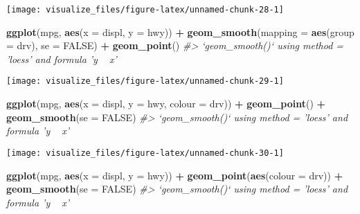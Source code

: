 \documentclass[]{book}
\newenvironment{Shaded}{\begin{snugshade}}{\end{snugshade}}
\newcommand{\CommentTok}[1]{\textcolor[rgb]{0.56,0.35,0.01}{\textit{#1}}}
\newcommand{\DataTypeTok}[1]{\textcolor[rgb]{0.13,0.29,0.53}{#1}}
\newcommand{\KeywordTok}[1]{\textcolor[rgb]{0.13,0.29,0.53}{\textbf{#1}}}
\newcommand{\NormalTok}[1]{#1}
\newcommand{\OperatorTok}[1]{\textcolor[rgb]{0.81,0.36,0.00}{\textbf{#1}}}
\newcommand{\OtherTok}[1]{\textcolor[rgb]{0.56,0.35,0.01}{#1}}
\newcommand{\StringTok}[1]{\textcolor[rgb]{0.31,0.60,0.02}{#1}}
\theoremstyle{plain}
\theoremstyle{remark}
\theoremstyle{definition}
\theoremstyle{definition}
\theoremstyle{definition}
\theoremstyle{remark}
\begin{document}
\begin{center}\texttt{[image: visualize\_files/figure-latex/unnamed-chunk-28-1]} \end{center}

\begin{Shaded}
\begin{Highlighting}[]
\KeywordTok{ggplot}\NormalTok{(mpg, }\KeywordTok{aes}\NormalTok{(}\DataTypeTok{x =}\NormalTok{ displ, }\DataTypeTok{y =}\NormalTok{ hwy)) }\OperatorTok{+}
\StringTok{  }\KeywordTok{geom_smooth}\NormalTok{(}\DataTypeTok{mapping =} \KeywordTok{aes}\NormalTok{(}\DataTypeTok{group =}\NormalTok{ drv), }\DataTypeTok{se =} \OtherTok{FALSE}\NormalTok{) }\OperatorTok{+}
\StringTok{  }\KeywordTok{geom_point}\NormalTok{()}
\CommentTok{#> `geom_smooth()` using method = 'loess' and formula 'y ~ x'}
\end{Highlighting}
\end{Shaded}

\begin{center}\texttt{[image: visualize\_files/figure-latex/unnamed-chunk-29-1]} \end{center}

\begin{Shaded}
\begin{Highlighting}[]
\KeywordTok{ggplot}\NormalTok{(mpg, }\KeywordTok{aes}\NormalTok{(}\DataTypeTok{x =}\NormalTok{ displ, }\DataTypeTok{y =}\NormalTok{ hwy, }\DataTypeTok{colour =}\NormalTok{ drv)) }\OperatorTok{+}
\StringTok{  }\KeywordTok{geom_point}\NormalTok{() }\OperatorTok{+}
\StringTok{  }\KeywordTok{geom_smooth}\NormalTok{(}\DataTypeTok{se =} \OtherTok{FALSE}\NormalTok{)}
\CommentTok{#> `geom_smooth()` using method = 'loess' and formula 'y ~ x'}
\end{Highlighting}
\end{Shaded}

\begin{center}\texttt{[image: visualize\_files/figure-latex/unnamed-chunk-30-1]} \end{center}

\begin{Shaded}
\begin{Highlighting}[]
\KeywordTok{ggplot}\NormalTok{(mpg, }\KeywordTok{aes}\NormalTok{(}\DataTypeTok{x =}\NormalTok{ displ, }\DataTypeTok{y =}\NormalTok{ hwy)) }\OperatorTok{+}
\StringTok{  }\KeywordTok{geom_point}\NormalTok{(}\KeywordTok{aes}\NormalTok{(}\DataTypeTok{colour =}\NormalTok{ drv)) }\OperatorTok{+}
\StringTok{  }\KeywordTok{geom_smooth}\NormalTok{(}\DataTypeTok{se =} \OtherTok{FALSE}\NormalTok{)}
\CommentTok{#> `geom_smooth()` using method = 'loess' and formula 'y ~ x'}
\end{Highlighting}
\end{Shaded}
\end{document}
